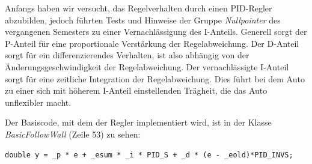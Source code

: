 Anfangs haben wir versucht, das Regelverhalten durch einen PID-Regler abzubilden, jedoch führten Tests und Hinweise der Gruppe \textit{Nullpointer} des vergangenen Semesters zu einer Vernachlässigung des I-Anteils. Generell sorgt der P-Anteil für eine proportionale Verstärkung der Regelabweichung. Der D-Anteil sorgt für ein differenzierendes Verhalten, ist also abhängig von der Änderungsgeschwindigkeit der Regelabweichung.
Der vernachlässigte I-Anteil sorgt für eine zeitliche Integration der Regelabweichung. Dies führt bei dem Auto zu einer sich mit höherem I-Anteil einstellenden Trägheit, die das Auto unflexibler macht.

Der Basiscode, mit dem der Regler implementiert wird, ist in der Klasse \textit{BasicFollowWall} (Zeile 53) zu sehen:
\begin{lstlisting}
double y = _p * e + _esum * _i * PID_S + _d * (e - _eold)*PID_INVS;
\end{lstlisting}

